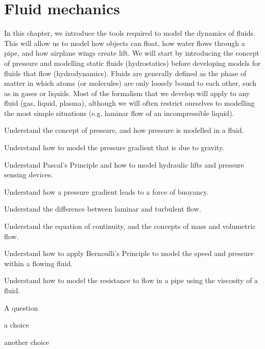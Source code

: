 
\chapter{Fluid mechanics}
\label{chapter:fluidmechanics}
In this chapter, we introduce the tools required to model the dynamics of fluids. This will allow us to model how objects can float, how water flows through a pipe, and how airplane wings create lift. We will start by introducing the concept of pressure and modelling static fluids (hydrostatics) before developing models for fluids that flow (hydrodynamics). Fluids are generally defined as the phase of matter in which atoms (or molecules) are only loosely bound to each other, such as in gases or liquids.  Most of the formalism that we develop will apply to any fluid (gas, liquid, plasma), although we will often restrict ourselves to modelling the most simple situations (e.g. laminar flow of an incompressible liquid).

\begin{learningObjectives}{
 \item Understand the concept of pressure, and how pressure is modelled in a fluid.
 \item Understand how to model the pressure gradient that is due to gravity.
 \item Understand Pascal's Principle and how to model hydraulic lifts and pressure sensing devices.
 \item Understand how a pressure gradient leads to a force of buoyancy.
 \item Understand the difference between laminar and turbulent flow.
 \item Understand the equation of continuity, and the concepts of mass and volumetric flow.
 \item Understand how to apply Bernoulli's Principle to model the speed and pressure within a flowing fluid.
 \item Understand how to model the resistance to flow in a pipe using the viscosity of a fluid.
 }
\end{learningObjectives}

\begin{opening}
\begin{MCquestion}{A question}
\item a choice
\item another choice %
\end{MCquestion}
\end{opening}

